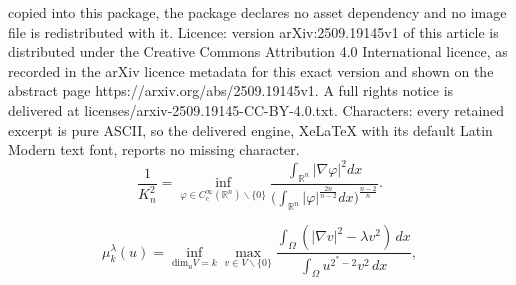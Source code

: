 \documentclass[10pt,a4paper]{amsart}
\newcommand{\Om}{\Omega}
\newcommand{\R}{\mathbb{R}}
\newcommand{\mkl}{\mu_{k}^{\lambda}}
\newcommand{\vp}{\varphi}
\begin{document}
copied into this package, the package declares no asset dependency and no image file is redistributed with it. Licence: version arXiv:2509.19145v1 of this article is distributed under the Creative Commons Attribution 4.0 International licence, as recorded in the arXiv licence metadata for this exact version and shown on the abstract page https://arxiv.org/abs/2509.19145v1. A full rights notice is delivered at licenses/arxiv-2509.19145-CC-BY-4.0.txt. Characters: every retained excerpt is pure ASCII, so the delivered engine, XeLaTeX with its default Latin Modern text font, reports no missing character.
\begin{equation} \label{defK0}
 \frac{1}{K_n^2} = \inf_{\vp \in C^\infty_c(\R^n) \backslash \{0\}} \frac{\int_{\R^n}|\nabla \vp|^2 dx}{\big(\int_{\R^n} |\vp|^{\frac{2n}{n-2}}dx \big)^{\frac{n-2}{n}}}. 
 \end{equation}

\begin{equation} \label{muk}
\mkl(u) = \inf_{\text{dim}_u V = k} \max_{v \in V \backslash \{0\}} \frac{\int_{\Om}\left(  |\nabla v|^2 - \lambda v^2 \right) \, dx}{\int_{\Om} u^{2^*-2} v^2 \, dx},
\end{equation}
\end{document}

